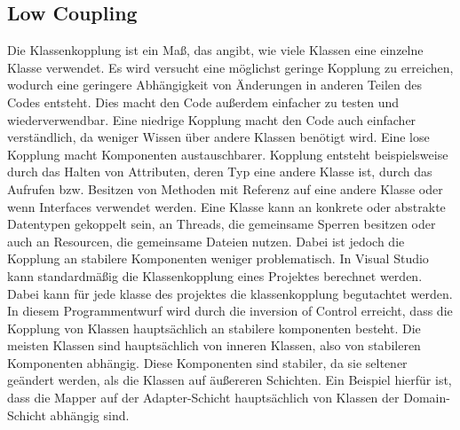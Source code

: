 \subsection{Low Coupling}
Die Klassenkopplung ist ein Maß, das angibt, wie viele Klassen eine einzelne Klasse verwendet. Es wird versucht eine möglichst geringe Kopplung zu erreichen, wodurch eine geringere Abhängigkeit von Änderungen in anderen Teilen des Codes entsteht. 
Dies macht den Code außerdem einfacher zu testen und wiederverwendbar. Eine niedrige Kopplung macht den Code auch einfacher verständlich, da weniger Wissen über andere Klassen benötigt wird. Eine lose Kopplung macht Komponenten austauschbarer.
\newline Kopplung entsteht beispielsweise durch das Halten von Attributen, deren Typ eine andere Klasse ist, durch das Aufrufen bzw. Besitzen von Methoden mit Referenz auf eine andere Klasse oder wenn Interfaces verwendet werden.
Eine Klasse kann an konkrete oder abstrakte Datentypen gekoppelt sein, an Threads, die gemeinsame Sperren besitzen oder auch an Resourcen, die gemeinsame Dateien nutzen. Dabei ist jedoch die Kopplung an stabilere Komponenten weniger problematisch.
\newline In Visual Studio kann standardmäßig die Klassenkopplung eines Projektes berechnet werden. Dabei kann für jede klasse des projektes die klassenkopplung begutachtet werden.
\newline In diesem Programmentwurf wird durch die inversion of Control erreicht, dass die Kopplung von Klassen hauptsächlich an stabilere komponenten besteht. Die meisten Klassen sind hauptsächlich von inneren Klassen, also von stabileren Komponenten abhängig. Diese 
Komponenten sind stabiler, da sie seltener geändert werden, als die Klassen auf äußereren Schichten. Ein Beispiel hierfür ist, dass die Mapper auf der Adapter-Schicht hauptsächlich von Klassen der Domain-Schicht abhängig sind.
